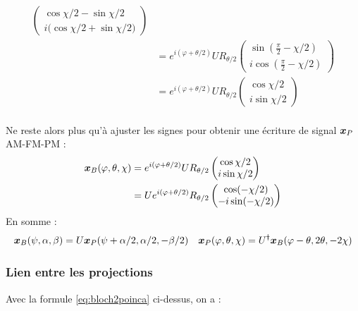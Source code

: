 \begin{annexe}
\begin{align*}
\begin{pmatrix}
		\cos \chi/2 - \sin\chi/2 \\ 
		i\big(\cos\chi/2 + \sin\chi/2\big)
	\end{pmatrix} \\
	&= e^{i(\varphi + \theta/2)}U R_{\theta/2} \begin{pmatrix} 
		\sin\left( \frac{\pi}{2} - \chi/2\right) \\ 
		i\cos\left( \frac{\pi}{2} - \chi/2\right)
	\end{pmatrix} \\
	&= e^{i(\varphi + \theta/2)}U R_{\theta/2} \begin{pmatrix} 
		\cos \chi/2 \\ 
		i\sin \chi/2
	\end{pmatrix}
\end{align*}
\\
Ne reste alors plus qu'à ajuster les signes pour obtenir une écriture de signal $\boldsymbol{x}_P$ AM-FM-PM :
\begin{align*}
	\boldsymbol{x}_B(\varphi, \theta, \chi) &= e^{i(\varphi + \theta/2)}U R_{\theta/2} \begin{pmatrix} 
		\cos \chi/2 \\ 
		i\sin \chi/2
	\end{pmatrix} \\
	&= U e^{i(\varphi + \theta/2)} R_{\theta/2} \begin{pmatrix} 
		\cos (-\chi/2) \\ 
		-i\sin (-\chi/2)
	\end{pmatrix}
\end{align*}
En somme :
\begin{align} \label{eq:bloch2poinca}
	\boldsymbol{x}_B(\psi, \alpha, \beta) &= U \boldsymbol{x}_P(\psi + \alpha/2, \alpha/2, -\beta/2)  & 
	\boldsymbol{x}_P(\varphi, \theta, \chi) = U^\dagger 	\boldsymbol{x}_B(\varphi-\theta, 2\theta, -2\chi)	
\end{align}
\skipl 



\subsubsection{Lien entre les projections}

Avec la formule \eqref{eq:bloch2poinca} ci-dessus, on a :


\end{annexe}
